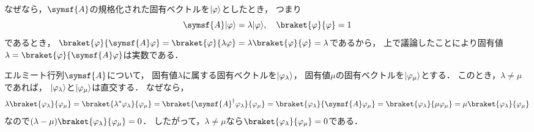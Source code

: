 \documentclass[
]{sotsu}
\begin{document}
\quad 
なぜなら，$\symsf{A}$の規格化された固有ベクトルを$\lvert\varphi\rangle$としたとき，
つまり
\begin{equation*}
    \symsf{A} \ket{\varphi} = \lambda \ket{\varphi},
    \quad 
    \braket{\varphi}{\varphi} = 1
\end{equation*}
であるとき，
\(
    \braket{\varphi}{\symsf{A} \varphi} 
        = \braket{\varphi}{\lambda \varphi} 
        = \lambda \braket{\varphi}{\varphi} 
        = \lambda
\)であるから，
上で議論したことにより固有値$\lambda = \braket{\varphi}{\symsf{A} \varphi}$は実数である．




\quad 
エルミート行列$\symsf{A}$について，
固有値$\lambda$に属する固有ベクトルを$\lvert\varphi_\lambda\rangle$，
固有値$\mu$の固有ベクトルを$\lvert\varphi_\mu\rangle$とする．
このとき，$\lambda \neq \mu$であれば，
$\lvert\varphi_\lambda\rangle$と$\lvert\varphi_\mu\rangle$は直交する．
なぜなら，
\begin{equation*}
    \lambda \braket{\varphi_\lambda}{\varphi_\mu}
    = \braket{\conj{\lambda} \varphi_\lambda}{\varphi_\mu}
    = \braket{\adjoint{\symsf{A}} \varphi_\lambda}{\varphi_\mu}
    = \braket{\varphi_\lambda}{\symsf{A} \varphi_\mu}
    = \braket{\varphi_\lambda}{\mu \varphi_\mu}
    = \mu \braket{\varphi_\lambda}{\varphi_\mu}
\end{equation*}
なので$(\lambda - \mu) \braket{\varphi_\lambda}{\varphi_\mu} = 0$．
したがって，$\lambda \neq \mu$なら$\braket{\varphi_\lambda}{\varphi_\mu} = 0$である．
\end{document}
